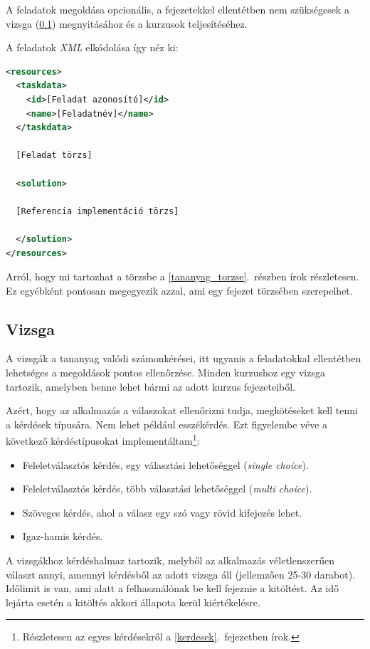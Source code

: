 \documentclass[12pt,a4paper]{article}
\newcommand{\xml}{\textit{XML}\xspace}
\begin{document}
	A feladatok megoldása opcionális, a fejezetekkel ellentétben nem szükségesek a vizsga (\ref{vizsga}) megnyitásához és a kurzusok teljesítéséhez.

	A feladatok \xml elkódolása így néz ki:
	
	\bigskip
	\begin{lstlisting}[language=XML]
<resources>
  <taskdata>
    <id>[Feladat azonosító]</id>
    <name>[Feladatnév]</name>
  </taskdata>
  
  [Feladat törzs]
  	
  <solution>
  
  [Referencia implementáció törzs]
  
  </solution>
</resources>
	\end{lstlisting}
	\bigskip

	Arról, hogy mi tartozhat a törzsbe a \ref{tananyag_torzse}.\ részben írok részletesen. Ez egyébként pontosan megegyezik azzal, ami egy fejezet törzsében szerepelhet.

	\subsection{Vizsga}\label{vizsga}
	
	A vizsgák a tananyag valódi számonkérései, itt ugyanis a feladatokkal ellentétben lehetséges a megoldások pontos ellenőrzése. Minden kurzushoz egy vizsga tartozik, amelyben benne lehet bármi az adott kurzus fejezeteiből.
	
	Azért, hogy az alkalmazás a válaszokat ellenőrizni tudja, megkötéseket kell tenni a kérdések típusára. Nem lehet például esszékérdés. Ezt figyelembe véve a következő kérdéstípusokat implementáltam\footnote{Részletesen az egyes kérdésekről a \ref{kerdesek}.\ fejezetben írok.}:
	
	\begin{itemize}
		\item Feleletválasztós kérdés, egy választási lehetőséggel (\textit{single choice}).
		\item Feleletválasztós kérdés, több választási lehetőséggel (\textit{multi choice}).
		\item Szöveges kérdés, ahol a válasz egy szó vagy rövid kifejezés lehet.
		\item Igaz-hamis kérdés.
	\end{itemize}
	
	A vizsgákhoz kérdéshalmaz tartozik, melyből az alkalmazás véletlenszerűen választ annyi, amennyi kérdésből az adott vizsga áll (jellemzően 25-30 darabot). Időlimit is van, ami alatt a felhasználónak be kell fejeznie a kitöltést. Az idő lejárta esetén a kitöltés akkori állapota kerül kiértékelésre.
	
\end{document}
